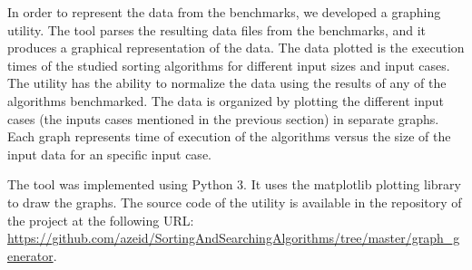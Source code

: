 In order to represent the data from the benchmarks, we developed a graphing utility. The tool parses the resulting data files from the benchmarks, and it produces a graphical representation of the data. The data plotted is the execution times of the studied sorting algorithms for different input sizes and input cases. The utility has the ability to normalize the data using the results of any of the algorithms benchmarked. The data is organized by plotting the different input cases (the inputs cases mentioned in the previous section) in separate graphs. Each graph represents time of execution of the algorithms versus the size of the input data for an specific input case.

The tool was implemented using Python 3. It uses the matplotlib plotting library to draw the graphs. The source code of the utility is available in the repository of the project at the following URL: \url{https://github.com/azeid/SortingAndSearchingAlgorithms/tree/master/graph_generator}.

